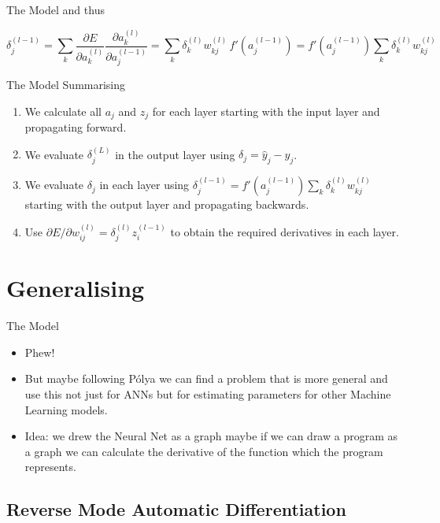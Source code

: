 \documentclass{beamer}
\begin{document}
\begin{frame}[fragile]{The Model}
and thus

$$
\delta_j^{(l-1)} =
\sum_k \frac{\partial E}{\partial a_k^{(l)}}\frac{\partial a_k^{(l)}}{\partial a_j^{(l-1)}} =
\sum_k \delta_k^{(l)} w_{kj}^{(l)}\, f'(a_j^{(l-1)}) =
f'(a_j^{(l-1)}) \sum_k \delta_k^{(l)} w_{kj}^{(l)}
$$
\end{frame}

\begin{frame}[fragile]{The Model}
Summarising

\begin{enumerate}
\item
We calculate all $a_j$ and $z_j$ for each layer starting with the
input layer and propagating forward.
\item
We evaluate $\delta_j^{(L)}$ in the output layer using $\delta_j = \hat{y}_j - y_j$.
\item
We evaluate $\delta_j$ in each layer using $\delta_j^{(l-1)} =
f'(a_j^{(l-1)})\sum_k \delta_k^{(l)} w_{kj}^{(l)}$ starting with the output
layer and propagating backwards.
\item
Use $\partial E / \partial w_{ij}^{(l)} = \delta_j^{(l)} z_i^{(l-1)}$ to obtain the
required derivatives in each layer.
\end{enumerate}
\end{frame}

\section{Generalising}

\begin{frame}[fragile]{The Model}
\begin{itemize}
\item
Phew!
\item
But maybe following P\'{o}lya we can find a problem that is more
general and use this not just for ANNs but for estimating parameters
for other Machine Learning models.
\item
Idea: we drew the Neural Net as a graph maybe if we can draw a program as a
graph we can calculate the derivative of the function which the
program represents.
\end{itemize}
\end{frame}

\subsection{Reverse Mode Automatic Differentiation}
\end{document}
